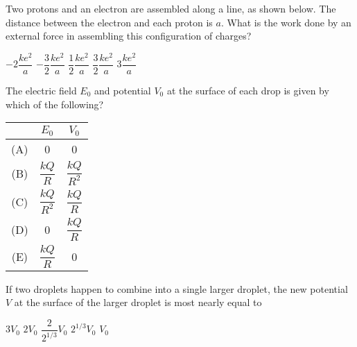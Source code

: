\documentclass[12pt]{../oss-classkick-exam}
\begin{document}
\begin{questions}
  \question Two protons and an electron are assembled along a line, as shown
  below. The distance between the electron and each proton is $a$. What is the
  work done by an external force in assembling this configuration of charges?
  \begin{choices}
    \choice $-2\dfrac{ke^2}a$
    \choice $-\dfrac32\dfrac{ke^2}a$
    \choice $\dfrac12\dfrac{ke^2}a$
    \choice $\dfrac32\dfrac{ke^2}a$
    \choice $3\dfrac{ke^2}a$
  \end{choices}


  \question The electric field $E_0$ and potential $V_0$ at the surface of each
  drop is given by which of the following?
  \label{rain1}
  
  \begin{tabular}{ccc}
    & $E_0$ & $V_0$ \\ \hline
    (A) & 0 & 0 \\
    (B) & $\dfrac{kQ}R$ & $\dfrac{kQ}{R^2}$ \\
    (C) & $\dfrac{kQ}{R^2}$ & $\dfrac{kQ}R$ \\
    (D) & 0 & $\dfrac{kQ}R$ \\
    (E) & $\dfrac{kQ}R$ & 0
  \end{tabular}

  \question If two droplets happen to combine into a single larger droplet, the
  new potential $V$ at the surface of the larger droplet is most nearly equal to
  \label{rain2}
  \begin{choices}
    \choice $3V_0$
    \choice $2V_0$
    \choice $\dfrac2{2^{1/3}}V_0$
    \choice $2^{1/3}V_0$
    \choice $V_0$
  \end{choices}

  \uplevel{\rule{\linewidth}{.7pt}}
  

\end{questions}
\end{document}
